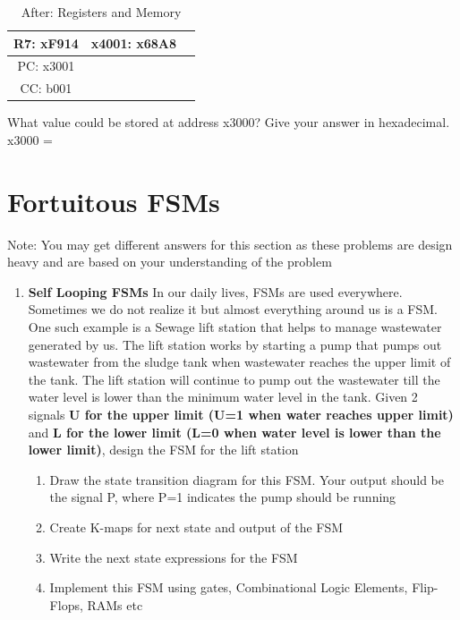 \documentclass{article}
\begin{document}
\begin{enumerate}[label=(\alph*)]
\begin{enumerate}[label=(\alph*)]
\begin{enumerate}[label=(\roman*)]
\begin{table}[h]
\begin{tabular}{|c|c|c|}
            R7: xF914 & x4001: x68A8 & \\
            \hline
            PC: x3001 & & \\
            \hline
            CC: b001 & & \\
            \hline
            \end{tabular}
            \caption{After: Registers and Memory}
            \label{tab:after}
            \end{table}
            \newline
            What value could be stored at address x3000? Give your answer in hexadecimal.
            \newline
            \newline
            x3000 =
        \end{enumerate}
        \newpage
    \end{enumerate}
    \section{Fortuitous FSMs}
    Note: You may get different answers for this section as these problems are design heavy and are based on your understanding of the problem
    \begin{enumerate}[label=(\alph*), itemsep = 120pt]
        \item \textbf{Self Looping FSMs} In our daily lives, FSMs are used everywhere. Sometimes we do not realize it but almost everything around us is a FSM. One such example is a Sewage lift station that helps to manage wastewater generated by us. The lift station works by starting a pump that pumps out wastewater from the sludge tank when wastewater reaches the upper limit of the tank. The lift station will continue to pump out the wastewater till the water level is lower than the minimum water level in the tank. Given 2 signals \textbf{U for the upper limit (U=1 when water reaches upper limit)} and \textbf{L for the lower limit (L=0 when water level is lower than the lower limit)}, design the FSM for the lift station
        \begin{enumerate}[label=(\roman*), itemsep = 120pt]
            \item Draw the state transition diagram for this FSM. Your output should be the signal P, where P=1 indicates the pump should be running
            \item Create K-maps for next state and output of the FSM
            \item Write the next state expressions for the FSM
            \item Implement this FSM using gates, Combinational Logic Elements, Flip-Flops, RAMs etc
        \end{enumerate}
    \end{enumerate}
    \newpage


\end{enumerate}
\end{document}
